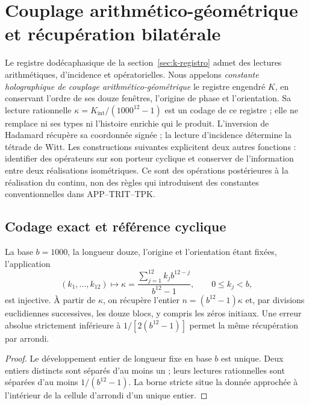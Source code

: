 \section{Couplage arithmético-géométrique et récupération bilatérale}
\label{sec:acoplamiento-recuperacion}

Le registre dodécaphasique de la section~\ref{sec:k-registro} admet
des lectures arithmétiques, d’incidence et opératorielles. Nous appelons
\emph{constante holographique de couplage arithmético-géométrique}
le registre engendré \(K\), en conservant l’ordre de ses douze fenêtres,
l’origine de phase et l’orientation. Sa lecture rationnelle
\(\kappa=K_{\mathrm{int}}/(1000^{12}-1)\) est un codage de ce
registre ; elle ne remplace ni ses types ni l’histoire enrichie qui le produit.
L’inversion de Hadamard récupère sa coordonnée signée ; la lecture
d’incidence détermine la tétrade de Witt. Les constructions suivantes
explicitent deux autres fonctions : identifier des opérateurs sur son porteur
cyclique et conserver de l’information entre deux réalisations isométriques.
Ce sont des opérations postérieures à la réalisation du continu, non des règles
qui introduisent des constantes conventionnelles dans APP--TRIT--TPK.

\subsection{Codage exact et référence cyclique}
\label{subsec:acoplamiento-codigo}

\begin{proposition}
La base \(b=1000\), la longueur douze, l’origine et l’orientation étant fixées, l’application
\[
 (k_1,\ldots,k_{12})\longmapsto
 \kappa=\frac{\sum_{j=1}^{12}k_jb^{12-j}}{b^{12}-1},
 \qquad 0\leq k_j<b,
\]
est injective. À partir de \(\kappa\), on récupère l’entier
\(n=(b^{12}-1)\kappa\) et, par divisions euclidiennes successives, les douze
blocs, y compris les zéros initiaux. Une erreur absolue strictement
inférieure à \(1/[2(b^{12}-1)]\) permet la même récupération par arrondi.
\end{proposition}
\begin{proof}
Le développement entier de longueur fixe en base \(b\) est unique. Deux entiers
distincts sont séparés d’au moins un ; leurs lectures rationnelles
sont séparées d’au moins \(1/(b^{12}-1)\). La borne stricte situe la
donnée approchée à l’intérieur de la cellule d’arrondi d’un unique entier.
\end{proof}

